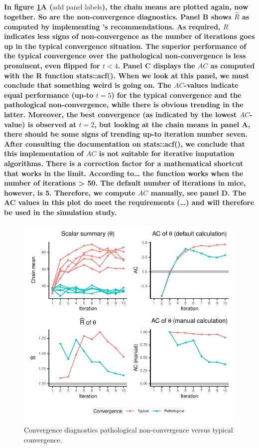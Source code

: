 \documentclass[Royal,times,sageh]{sagej}
\begin{document}
\textbf{In figure \ref{fig:diagnostics}A (}add panel labels\textbf{),
the chain means are plotted again, now together. So are the
non-convergence diagnostics. Panel B shows \(\widehat{R}\) as computed
by implementing \citet{veht19} 's recommendations. As required,
\(\widehat{R}\) indicates less signs of non-convergence as the number of
iterations goes up in the typical convergence situation. The superior
performance of the typical convergence over the pathological
non-convergence is less prominent, even flipped for \(t<4\). Panel C
displays the \(AC\) as computed with the R function stats::acf(). When
we look at this panel, we must conclude that something weird is going
on. The \(AC\)-values indicate equal performance (up-to \(t=5\)) for the
typical convergence and the pathological non-convergence, while there is
obvious trending in the latter. Moreover, the best convergence (as
indicated by the lowest \(AC\)-value) is observed at \(t=2\), but
looking at the chain means in panel A, there should be some signs of
trending up-to iteration number seven. After consulting the
documentation on stats::acf(), we conclude that this implementation of
\(AC\) is not suitable for iterative imputation algorithms. There is a
correction factor for a mathematical shortcut that works in the limit.
According to\ldots{} the function works when the number of iterations
\textgreater{} 50. The default number of iterations in mice, however, is
5. Therefore, we compute \(AC\) manually, see panel D. The AC values in
this plot do meet the requirements (\ldots) and will therefore be used
in the simulation study.}

\begin{figure}

{\centering \includegraphics{manuscript_files/figure-latex/diagnostics-1} 

}

\caption{Convergence diagnostics pathological non-convergence versus typical convergence.}\label{fig:diagnostics}
\end{figure}
\end{document}
